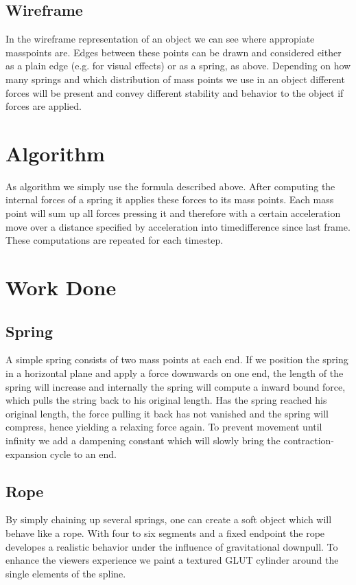\documentclass[11pt]{article}
\begin{document}
\subsection{Wireframe}
In the wireframe representation of an object we can see where appropiate masspoints are. Edges between these points can be drawn and considered either as a plain edge (e.g. for visual effects) or as a spring, as above. Depending on how many springs and which distribution of mass points we use in an object different forces will be present and convey different stability and behavior to the object if forces are applied.
%
%
%
\section{Algorithm}
As algorithm we simply use the formula described above. After computing the internal forces of a spring it applies these forces to its mass points. Each mass point will sum up all forces pressing it and therefore with a certain acceleration move over a distance specified by acceleration into timedifference since last frame. These computations are repeated for each timestep.

\section{Work Done}
\subsection{Spring}
A simple spring consists of two mass points at each end. If we position the spring in a horizontal plane and apply a force downwards on one end, the length of the spring will increase and internally the spring will compute a inward bound force, which pulls the string back to his original length. Has the spring reached his original length, the force pulling it back has not vanished and the spring will compress, hence yielding a relaxing force again. To prevent movement until infinity we add a dampening constant which will slowly bring the contraction-expansion cycle to an end.
\subsection{Rope}
By simply chaining up several springs, one can create a soft object which will behave like a rope. With four to six segments and a fixed endpoint the rope developes a realistic behavior under the influence of gravitational downpull. To enhance the viewers experience we paint a textured GLUT cylinder around the single elements of the spline.
\end{document}
